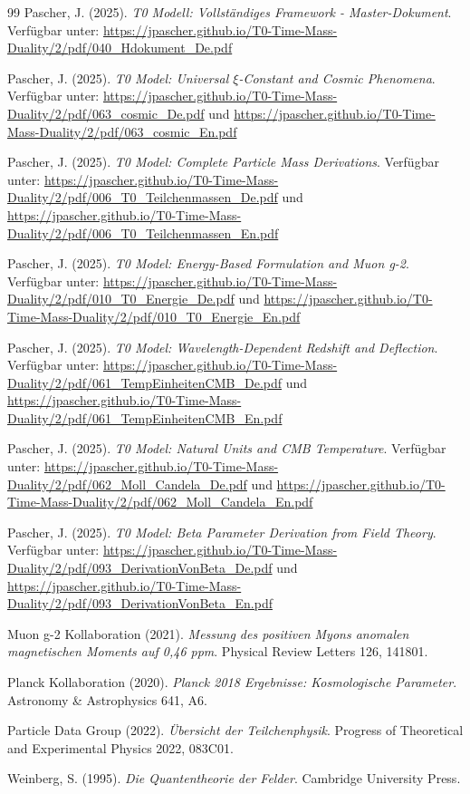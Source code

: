 \documentclass[12pt,a4paper]{report}
\begin{document}
	\begin{thebibliography}{99}
		Pascher, J. (2025). \textit{T0 Modell: Vollständiges Framework - Master-Dokument}. Verfügbar unter: \url{https://jpascher.github.io/T0-Time-Mass-Duality/2/pdf/040_Hdokument_De.pdf}
		
		Pascher, J. (2025). \textit{T0 Model: Universal $\xi$-Constant and Cosmic Phenomena}. Verfügbar unter: \url{https://jpascher.github.io/T0-Time-Mass-Duality/2/pdf/063_cosmic_De.pdf} und \url{https://jpascher.github.io/T0-Time-Mass-Duality/2/pdf/063_cosmic_En.pdf}
		
		Pascher, J. (2025). \textit{T0 Model: Complete Particle Mass Derivations}. Verfügbar unter: \url{https://jpascher.github.io/T0-Time-Mass-Duality/2/pdf/006_T0_Teilchenmassen_De.pdf} und \url{https://jpascher.github.io/T0-Time-Mass-Duality/2/pdf/006_T0_Teilchenmassen_En.pdf}
		
		Pascher, J. (2025). \textit{T0 Model: Energy-Based Formulation and Muon g-2}. Verfügbar unter: \url{https://jpascher.github.io/T0-Time-Mass-Duality/2/pdf/010_T0_Energie_De.pdf} und \url{https://jpascher.github.io/T0-Time-Mass-Duality/2/pdf/010_T0_Energie_En.pdf}
		
		Pascher, J. (2025). \textit{T0 Model: Wavelength-Dependent Redshift and Deflection}. Verfügbar unter: \url{https://jpascher.github.io/T0-Time-Mass-Duality/2/pdf/061_TempEinheitenCMB_De.pdf} und \url{https://jpascher.github.io/T0-Time-Mass-Duality/2/pdf/061_TempEinheitenCMB_En.pdf}
		
		Pascher, J. (2025). \textit{T0 Model: Natural Units and CMB Temperature}. Verfügbar unter: \url{https://jpascher.github.io/T0-Time-Mass-Duality/2/pdf/062_Moll_Candela_De.pdf} und \url{https://jpascher.github.io/T0-Time-Mass-Duality/2/pdf/062_Moll_Candela_En.pdf}
		
		Pascher, J. (2025). \textit{T0 Model: Beta Parameter Derivation from Field Theory}. Verfügbar unter: \url{https://jpascher.github.io/T0-Time-Mass-Duality/2/pdf/093_DerivationVonBeta_De.pdf} und \url{https://jpascher.github.io/T0-Time-Mass-Duality/2/pdf/093_DerivationVonBeta_En.pdf}
		
		Muon g-2 Kollaboration (2021). \textit{Messung des positiven Myons anomalen magnetischen Moments auf 0,46 ppm}. Physical Review Letters 126, 141801.
		
		Planck Kollaboration (2020). \textit{Planck 2018 Ergebnisse: Kosmologische Parameter}. Astronomy \& Astrophysics 641, A6.
		
		Particle Data Group (2022). \textit{Übersicht der Teilchenphysik}. Progress of Theoretical and Experimental Physics 2022, 083C01.
		
		Weinberg, S. (1995). \textit{Die Quantentheorie der Felder}. Cambridge University Press.
	\end{thebibliography}
	
\end{document}
